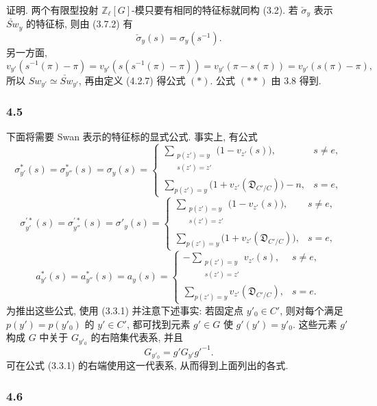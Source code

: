 证明. 两个有限型投射 $\mathbb Z_\ell[G]$-模只要有相同的特征标就同构 (3.2). 若 $\check\sigma_y$ 表示 $\check{Sw}_y$ 的特征标, 则由 (3.7.2) 有
\[
\check\sigma_y(s)=\sigma_y(s^{-1}).
\]
另一方面,
\[
v_{y'}(s^{-1}(\pi)-\pi)
=v_{y'}(s(s^{-1}(\pi)-\pi))
=v_{y'}(\pi-s(\pi))
=v_{y'}(s(\pi)-\pi),
\]
所以 $Sw_{y'}\simeq\check{Sw}_{y'}$, 再由定义 (4.2.7) 得公式 $(*)$. 公式 $(**)$ 由 3.8 得到.

\subsubsection*{4.5}

下面将需要 Swan 表示的特征标的显式公式. 事实上, 有公式
\[
\sigma^{*}_{y'}(s)=\sigma^{*}_{y''}(s)=\sigma_y(s)=
\begin{cases}
\displaystyle\sum_{\substack{p(z')=y\\s(z')=z'}}\bigl(1-v_{z'}(s)\bigr),& s\ne e,\\[0.8em]
\displaystyle\sum_{p(z')=y}\bigl(1+v_{z'}(\mathfrak D_{C'/C})\bigr)-n,& s=e,
\end{cases}
\tag{4.5.1}
\]
\[
\sigma^{\prime*}_{y'}(s)=\sigma^{\prime*}_{y''}(s)=\sigma'_y(s)=
\begin{cases}
\displaystyle\sum_{\substack{p(z')=y\\s(z')=z'}}\bigl(1-v_{z'}(s)\bigr),& s\ne e,\\[0.8em]
\displaystyle\sum_{p(z')=y}\bigl(1+v_{z'}(\mathfrak D_{C'/C})\bigr),& s=e,
\end{cases}
\tag{4.5.2}
\]
\[
a^{*}_{y'}(s)=a^{*}_{y''}(s)=a_y(s)=
\begin{cases}
\displaystyle-\sum_{\substack{p(z')=y\\s(z')=z'}}v_{z'}(s),& s\ne e,\\[0.8em]
\displaystyle\sum_{p(z')=y}v_{z'}(\mathfrak D_{C'/C}),& s=e.
\end{cases}
\tag{4.5.3}
\]
为推出这些公式, 使用 (3.3.1) 并注意下述事实: 若固定点 $y'_0\in C'$, 则对每个满足 $p(y')=p(y'_0)$ 的 $y'\in C'$, 都可找到元素 $g'\in G$ 使 $g'(y')=y'_0$. 这些元素 $g'$ 构成 $G$ 中关于 $G_{y'_0}$ 的右陪集代表系, 并且
\[
G_{y'_0}=g'G_{y'}g'^{-1}.
\]
可在公式 (3.3.1) 的右端使用这一代表系, 从而得到上面列出的各式.

\subsubsection*{4.6}

